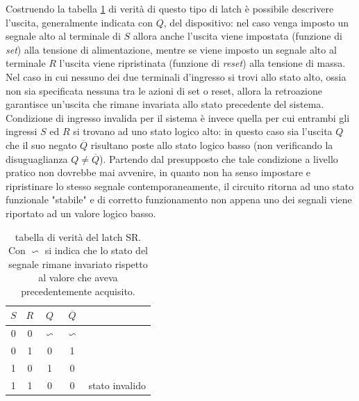 	Costruendo la tabella \ref{tab:srl:tabellaverita} di verità di questo tipo di latch è possibile descrivere l'uscita, generalmente indicata con $Q$, del dispositivo: nel caso venga imposto un segnale alto al terminale di $S$ allora anche l'uscita viene impostata (funzione di \textit{set}) alla tensione di alimentazione, mentre se viene imposto un segnale alto al terminale $R$ l'uscita viene ripristinata (funzione di \textit{reset}) alla tensione di massa. \\
	Nel caso in cui nessuno dei due terminali d'ingresso si trovi allo stato alto, ossia non sia specificata nessuna tra le azioni di set o reset, allora la retroazione garantisce un'uscita che rimane invariata allo stato precedente del sistema. Condizione di ingresso invalida per il sistema è invece quella per cui entrambi gli ingressi $S$ ed $R$ si trovano ad uno stato logico alto: in questo caso sia l'uscita $Q$ che il suo negato $\overline Q$ risultano poste allo stato logico basso (non verificando la disuguaglianza $Q\neq \overline Q$). Partendo dal presupposto che tale condizione a livello pratico non dovrebbe mai avvenire, in quanto non ha senso impostare e ripristinare lo stesso segnale contemporaneamente, il circuito ritorna ad uno stato funzionale "stabile" e di corretto funzionamento non appena uno dei segnali viene riportato ad un valore logico basso.
	
	
	\begin{table}[bht]
		\centering
		\begin{tabular}{c c | c c  l}
			$S$ & $R$ & $Q$ & $\overline Q$ \\ \hline
			0 & 0 & $\backsim$ & $\backsim$ \\
			0 & 1 & 0 & 1 \\
			1 & 0 & 1 & 0 \\
			1 & 1 & 0 & 0 & stato invalido 			
		\end{tabular}
		\caption{tabella di verità del latch SR. Con $\backsim$ si indica che lo stato del segnale rimane invariato rispetto al valore che aveva precedentemente acquisito.}
		\label{tab:srl:tabellaverita}
	\end{table}
	
